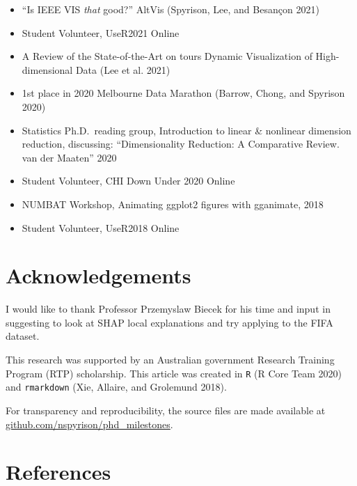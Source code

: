 \documentclass[
  11,
]{article}
\providecommand{\tightlist}{%
  \setlength{\itemsep}{0pt}\setlength{\parskip}{0pt}}
\begin{document}
\begin{itemize}
\tightlist
\item
  ``Is IEEE VIS \emph{that} good?'' AltVis (Spyrison, Lee, and Besançon 2021)
\item
  Student Volunteer, UseR2021 Online
\item
  A Review of the State-of-the-Art on tours Dynamic Visualization of High-dimensional Data (Lee et al. 2021)
\item
  1st place in 2020 Melbourne Data Marathon (Barrow, Chong, and Spyrison 2020)
\item
  Statistics Ph.D.~reading group, Introduction to linear \& nonlinear dimension reduction, discussing: ``Dimensionality Reduction: A Comparative
  Review. van der Maaten'' 2020
\item
  Student Volunteer, CHI Down Under 2020 Online
\item
  NUMBAT Workshop, Animating ggplot2 figures with gganimate, 2018
\item
  Student Volunteer, UseR2018 Online
\end{itemize}

\hypertarget{sec:acknowledgements}{%
\section{Acknowledgements}\label{sec:acknowledgements}}

I would like to thank Professor Przemyslaw Biecek for his time and input in suggesting to look at SHAP local explanations and try applying to the FIFA dataset.

This research was supported by an Australian government Research Training Program (RTP) scholarship. This article was created in \texttt{R} (R Core Team 2020) and \texttt{rmarkdown} (Xie, Allaire, and Grolemund 2018).

For transparency and reproducibility, the source files are made available at \href{https://github.com/nspyrison/phd_milestones}{github.com/nspyrison/phd\_milestones}.

\hypertarget{references}{%
\section*{References}\label{references}}
\end{document}
